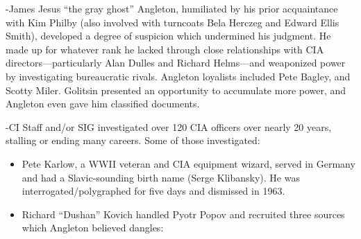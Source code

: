 \documentclass[
]{article}
\begin{document}
-James Jesus ``the gray ghost'' Angleton, humiliated by his prior
acquaintance with Kim Philby (also involved with turncoats Bela Herczeg
and Edward Ellis Smith), developed a degree of suspicion which
undermined his judgment. He made up for whatever rank he lacked through
close relationships with CIA directors---particularly Alan Dulles and
Richard Helms---and weaponized power by investigating bureaucratic
rivals. Angleton loyalists included Pete Bagley, and Scotty Miler.
Golitsin presented an opportunity to accumulate more power, and Angleton
even gave him classified documents.

-CI Staff and/or SIG investigated over 120 CIA officers over nearly 20
years, stalling or ending many careers. Some of those investigated:

\begin{itemize}
\item
  Pete Karlow, a WWII veteran and CIA equipment wizard, served in
  Germany and had a Slavic-sounding birth name (Serge Klibansky). He was
  interrogated/polygraphed for five days and dismissed in 1963.
\item
  Richard ``Dushan'' Kovich handled Pyotr Popov and recruited three
  sources which Angleton believed dangles:


\end{itemize}
\end{document}
